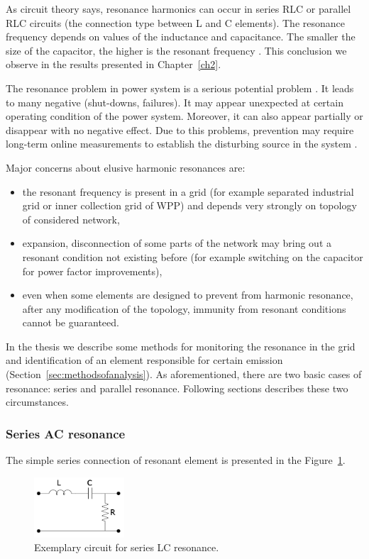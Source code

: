 \documentclass[12pt]{report} %
\begin{document}
As circuit theory says, resonance harmonics can occur in series RLC or parallel RLC circuits (the connection type between L and C elements). The resonance frequency depends on values of the inductance and capacitance. The smaller the size of the capacitor, the higher is the resonant frequency \cite{das}. This conclusion we observe in the results presented in Chapter~\ref{ch2}.

The resonance problem in power system is a serious potential problem \cite{das}. It leads to many negative (shut-downs, failures). It may appear unexpected at certain operating condition of the power system. Moreover, it can also appear partially or disappear with no negative effect. Due to this problems, prevention may require long-term online measurements to establish the disturbing source in the system \cite{das}.

Major concerns about elusive harmonic resonances are: \cite{das}
\begin{itemize}
	\item the resonant frequency is present in a grid (for example separated industrial grid or inner collection grid of WPP) and depends very strongly on topology of considered network,
	\item expansion, disconnection of some parts of the network may bring out a resonant condition not existing before (for example switching on the capacitor for power factor improvements),
	\item even when some elements are designed to prevent from harmonic resonance, after any modification of the topology, immunity from resonant conditions cannot be guaranteed.
\end{itemize}

In the thesis we describe some methods for monitoring the resonance in the grid and identification of an element responsible for certain emission (Section~\ref{sec:methodsofanalysis}). As aforementioned, there are two basic cases of resonance: series and parallel resonance. Following sections describes these two circumstances.

\subsubsection{Series AC resonance}
The simple series connection of resonant element is presented in the Figure~\ref{fig:seriescircuit}.

\begin{figure}[htb]
	\centering
    	\includegraphics[width=0.3\textwidth]{img/theory/series_circ.PNG}
  	\caption{Exemplary circuit for series LC resonance.}
  	\label{fig:seriescircuit}
\end{figure}
\FloatBarrier
\end{document}

